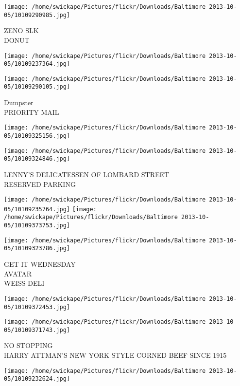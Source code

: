 \documentclass[10pt,letterpaper]{article}
\begin{document}
\vspace{0.25in}
\texttt{[image: /home/swickape/Pictures/flickr/Downloads/Baltimore 2013-10-05/10109290985.jpg]}

ZENO SLK\\
DONUT
\pagebreak

\texttt{[image: /home/swickape/Pictures/flickr/Downloads/Baltimore 2013-10-05/10109237364.jpg]}

\vspace{0.25in}
\texttt{[image: /home/swickape/Pictures/flickr/Downloads/Baltimore 2013-10-05/10109290105.jpg]}

Dumpster\\
PRIORITY MAIL
\pagebreak

\texttt{[image: /home/swickape/Pictures/flickr/Downloads/Baltimore 2013-10-05/10109325156.jpg]}

\vspace{0.25in}
\texttt{[image: /home/swickape/Pictures/flickr/Downloads/Baltimore 2013-10-05/10109324846.jpg]}

LENNY'S DELICATESSEN OF LOMBARD STREET\\
RESERVED PARKING
\pagebreak

\texttt{[image: /home/swickape/Pictures/flickr/Downloads/Baltimore 2013-10-05/10109235764.jpg]}
\texttt{[image: /home/swickape/Pictures/flickr/Downloads/Baltimore 2013-10-05/10109373753.jpg]}

\vspace{0.25in}
\texttt{[image: /home/swickape/Pictures/flickr/Downloads/Baltimore 2013-10-05/10109323786.jpg]}

GET IT WEDNESDAY\\
AVATAR\\
WEISS DELI
\pagebreak

\texttt{[image: /home/swickape/Pictures/flickr/Downloads/Baltimore 2013-10-05/10109372453.jpg]}

\vspace{0.25in}
\texttt{[image: /home/swickape/Pictures/flickr/Downloads/Baltimore 2013-10-05/10109371743.jpg]}

NO STOPPING\\
HARRY ATTMAN'S NEW YORK STYLE CORNED BEEF SINCE 1915
\pagebreak

\texttt{[image: /home/swickape/Pictures/flickr/Downloads/Baltimore 2013-10-05/10109232624.jpg]}
\end{document}
